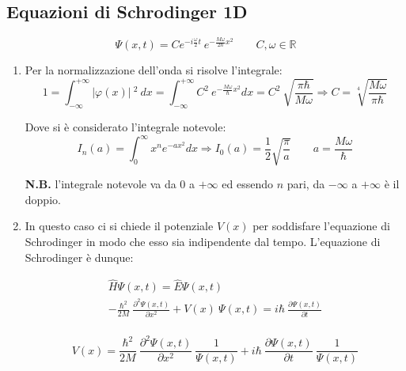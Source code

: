 \documentclass[12pt,twoside,a4]{article}
\begin{document}
\subsection{Equazioni di Schrodinger 1D}
\begin{solution}
\begin{equation*}
\Psi(x,t) = C e^{-i \frac{\omega}{2} t} \ e^{-\frac{M \omega }{2\hbar} x^2} \qquad  C,\omega \in \mathbb{R}  
\end{equation*}

\begin{enumerate}[label=(\textit{\roman*})]
    \item Per la normalizzazione dell'onda si risolve l'integrale: 
\begin{equation*}
    1 = \int_{-\infty}^{+\infty}
    {|\varphi(x)| \ ^2 \ }dx =  \int_{-\infty}^{+\infty}
    {C^2 \ e^{-\frac{M \omega}{\hbar} x^2} }dx = C^2 \ \sqrt{\frac{\pi \hbar}{M \omega}}   \Rightarrow  C = \sqrt[4]{\frac{M \omega}{\pi \hbar}}  
\end{equation*}

Dove si è considerato l'integrale notevole: \begin{equation*}
    I_n(a) = \int_{0}^{\infty} {x^n e^{-ax^2}} dx  \Rightarrow  I_0(a) = \frac{1}{2} \sqrt{\frac{\pi}{a}} \qquad a=\frac{M\omega}{\hbar}
\end{equation*}

\textbf{N.B.} l'integrale notevole va da 0 a $+\infty$ ed essendo $n$ pari, da $-\infty$ a $+\infty$ è il doppio.

\item In questo caso ci si chiede il potenziale $V(x)$ per soddisfare l'equazione di Schrodinger in modo che esso sia indipendente dal tempo. L'equazione di Schrodinger è dunque:

\begin{gather*}
	\hat{H}\Psi(x,t) =  \hat{E}\Psi(x,t) \\
	-\frac{\hbar^2}{2M} \ \frac{\partial^2 \Psi(x,t)}{\partial x^2} + V(x) \ \Psi(x,t)  =  i \hbar \ \frac{\partial \Psi(x,t)}{\partial t} \\
\end{gather*} 

\begin{equation}
	\label{eq:sol11.1pot}
	V(x) = \frac{\hbar^2}{2M} \ \frac{\partial^2 \Psi(x,t)}{\partial x^2} \ \frac{1}{\Psi(x,t)} +  i \hbar \ \frac{\partial \Psi(x,t)}{\partial t} \ \frac{1}{\Psi(x,t)}
\end{equation}



\end{enumerate}
\end{solution}
\end{document}
